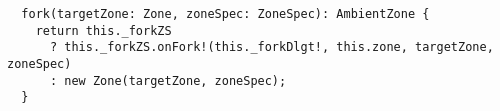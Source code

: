 \begin{verbatim}
  fork(targetZone: Zone, zoneSpec: ZoneSpec): AmbientZone {
    return this._forkZS
      ? this._forkZS.onFork!(this._forkDlgt!, this.zone, targetZone, zoneSpec)
      : new Zone(targetZone, zoneSpec);
  }
\end{verbatim}
